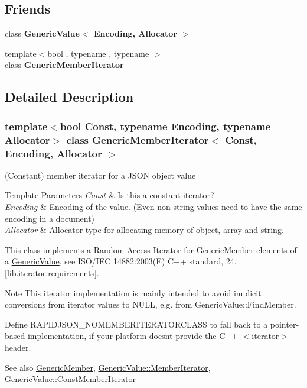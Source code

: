 \subsection*{Friends}
\begin{DoxyCompactItemize}
\item 
\mbox{\label{a02004_a82bdd5798f1a5ac0e3e7ba4bd6938cfc}} 
class {\bfseries Generic\+Value$<$ Encoding, Allocator $>$}
\item 
\mbox{\label{a02004_aa375aeb1ffac85cddc3a72a6c24ec6e1}} 
{\footnotesize template$<$bool , typename , typename $>$ }\\class {\bfseries Generic\+Member\+Iterator}
\end{DoxyCompactItemize}


\subsection{Detailed Description}
\subsubsection*{template$<$bool Const, typename Encoding, typename Allocator$>$\newline
class Generic\+Member\+Iterator$<$ Const, Encoding, Allocator $>$}

(Constant) member iterator for a J\+S\+ON object value 


\begin{DoxyTemplParams}{Template Parameters}
{\em Const} & Is this a constant iterator? \\
\hline
{\em Encoding} & Encoding of the value. (Even non-\/string values need to have the same encoding in a document) \\
\hline
{\em Allocator} & Allocator type for allocating memory of object, array and string.\\
\hline
\end{DoxyTemplParams}
This class implements a Random Access Iterator for \hyperlink{a02000}{Generic\+Member} elements of a \hyperlink{a01992}{Generic\+Value}, see I\+S\+O/\+I\+EC 14882\+:2003(E) C++ standard, 24. \mbox{[}lib.\+iterator.\+requirements\mbox{]}.

\begin{DoxyNote}{Note}
This iterator implementation is mainly intended to avoid implicit conversions from iterator values to {\ttfamily N\+U\+LL}, e.\+g. from Generic\+Value\+::\+Find\+Member.

Define {\ttfamily R\+A\+P\+I\+D\+J\+S\+O\+N\+\_\+\+N\+O\+M\+E\+M\+B\+E\+R\+I\+T\+E\+R\+A\+T\+O\+R\+C\+L\+A\+SS} to fall back to a pointer-\/based implementation, if your platform doesn\textquotesingle{}t provide the C++ $<$iterator$>$ header.
\end{DoxyNote}
\begin{DoxySeeAlso}{See also}
\hyperlink{a02000}{Generic\+Member}, \hyperlink{a01992_a349b8faae61edc42b4289726820be439}{Generic\+Value\+::\+Member\+Iterator}, \hyperlink{a01992_aac08c3e660a9036d3dcb8b10ff6c61f4}{Generic\+Value\+::\+Const\+Member\+Iterator} 
\end{DoxySeeAlso}



